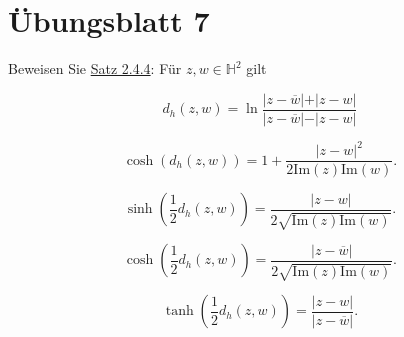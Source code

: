 \documentclass[11pt]{book}
\numberwithin{dummy}{section}
\theoremstyle{nonumberbreak}
\newenvironment{prob}[1][]{\ifthenelse{\equal{#1}{}}{\problem}{\problem[#1]}\rm}{\endproblem}
\newenvironment{sol}[1][]{\ifthenelse{\equal{#1}{}}{\solution}{\solution[#1]}\rm}{\endsolution}
\newcommand{\He}{\mathbb{H}}
\begin{document}
\begin{spacing}{1.4}
\begin{prob}
\begin{sol}
\begin{compactenum}
\end{compactenum}

\end{sol}

\end{prob}














\newpage




\titlespacing*{\section}{-16.5pt}{0pt}{20pt}
\renewcommand*\thesection{}
\section{Übungsblatt 7} %
\renewcommand*\thesection{\arabic{section}}



\hypertarget{Asiebeneins}{}
\begin{prob}   %
Beweisen Sie \hyperlink{satzzweiviervier}{Satz 2.4.4}: Für $z,w \in \He^2$ gilt
\begin{compactenum}
\item $$d_h(z,w) = \ln \frac{\vert z - \overline{w} \vert + \vert z-w \vert}{\vert z - \overline{w}\vert - \vert z - w \vert}$$
\item $$ \cosh \left( d_h(z,w)\right) = 1 + \frac{ \vert z-w \vert^2}{ 2 \mathrm{Im}(z) \mathrm{Im}(w)}.$$
\item $$\sinh\left( \frac{1}{2} d_h(z,w)\right) = \frac{\vert z - w \vert}{2 \sqrt{\mathrm{Im}(z) \mathrm{Im}(w)}}.$$
\item $$\cosh\left( \frac{1}{2} d_h(z,w)\right) = \frac{ \vert z - \overline{w}\vert}{2 \sqrt{\mathrm{Im}(z) \mathrm{Im}(w)}}.$$
\item $$\tanh\left( \frac{1}{2} d_h(z,w)\right) = \frac{\vert z - w \vert }{\vert z - \overline{w}\vert}.$$
\end{compactenum}


\end{prob}
\end{spacing}
\end{document}
